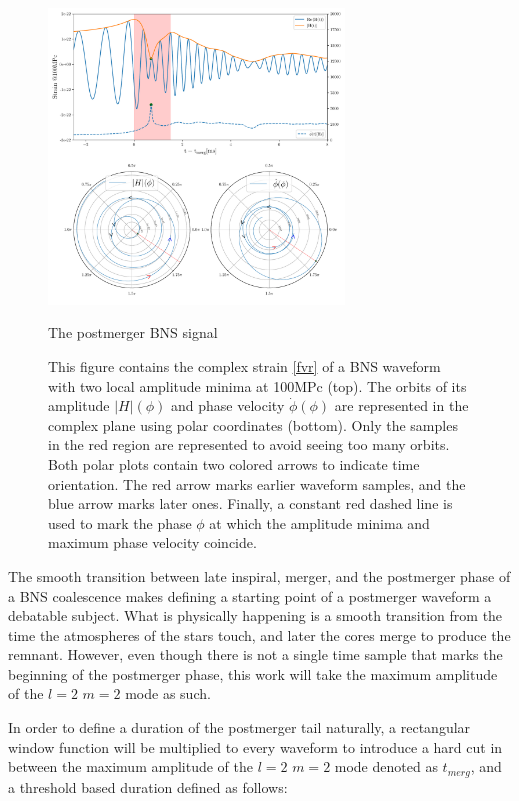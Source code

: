 \begin{figure}[hbt!]
\begin{center}
\includegraphics[width=0.7\textwidth, angle=0]{images/Data_analysis/results/postm_wf.pdf}
\end{center}
\captionsetup{width=0.8\textwidth}
\caption{The postmerger BNS signal}
\caption*{This figure contains the complex strain \ref{fvr} of a BNS waveform \cite{Dietrich:2018phi} with two local amplitude minima at 100MPc (top). The orbits of its amplitude $|H|(\phi)$ and phase velocity $\dot{\phi}(\phi)$ are represented in the complex plane using polar coordinates (bottom). Only the samples in the red region are represented to avoid seeing too many orbits.
Both polar plots contain two colored arrows to indicate time orientation. The red arrow marks earlier waveform samples, and the blue arrow marks later ones. Finally, a constant red dashed line is used to mark the phase $\phi$ at which the amplitude minima and maximum phase velocity coincide.}
\label{fig:9} 
\end{figure}

\FloatBarrier

The smooth transition between late inspiral, merger, and the postmerger phase of a BNS coalescence makes defining a starting point of a postmerger waveform a debatable subject. What is physically happening is a smooth transition from the time the atmospheres of the stars touch, and later the cores merge to produce the remnant. However, even though there is not a single time sample that marks the beginning of the postmerger phase, this work will take the maximum amplitude of the $l=2$ $m=2$ mode as such. 

In order to define a duration of the postmerger tail naturally, a rectangular window function will be multiplied to every waveform to introduce a hard cut in between the maximum amplitude of the $l=2$ $m=2$ mode denoted as $t_{merg}$, and a threshold based duration defined as follows:

